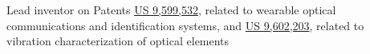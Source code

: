 \item Lead inventor on Patents \href{https://patents.google.com/patent/US9599532}{US 9,599,532}, related to wearable optical communications and identification systems, 
and \href{https://patents.google.com/patent/US9602203B2/en}{US 9,602,203}, related to vibration characterization of optical elements